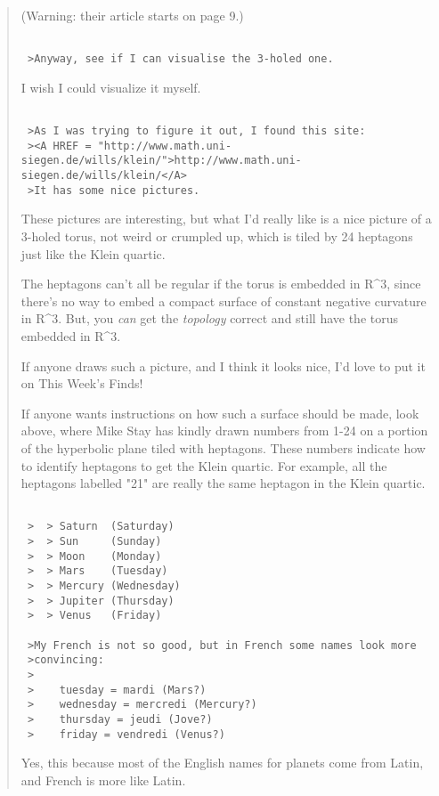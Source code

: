 \begin{quote}
(Warning: their article starts on page 9.)  


\begin{verbatim}

 >Anyway, see if I can visualise the 3-holed one.
\end{verbatim}
    

I wish I could visualize it myself.


\begin{verbatim}

 >As I was trying to figure it out, I found this site:
 ><A HREF = "http://www.math.uni-siegen.de/wills/klein/">http://www.math.uni-siegen.de/wills/klein/</A>
 >It has some nice pictures.
\end{verbatim}
    

These pictures are interesting, but what I'd really like
is a nice picture of a 3-holed torus, not weird or crumpled up, 
which is tiled by 24 heptagons just like the Klein quartic.
 
The heptagons can't all be regular if the torus is embedded in
R^{3}, since there's no way to embed a compact surface of constant
negative curvature in R^{3}.  
But, you \emph{can} get the \emph{topology}
correct and still have the torus embedded in R^{3}.

If anyone draws such a picture, and I think it looks nice, I'd love
to put it on This Week's Finds!

If anyone wants instructions on how such a surface should be made, 
look above, where Mike Stay has kindly drawn numbers from 1-24 on a 
portion of the hyperbolic plane tiled with heptagons.  These numbers 
indicate how to identify heptagons to get the Klein quartic.  For example, 
all the heptagons labelled "21" are really the same 
heptagon in the Klein quartic.


\begin{verbatim}

 >  > Saturn  (Saturday)
 >  > Sun     (Sunday)
 >  > Moon    (Monday)
 >  > Mars    (Tuesday)
 >  > Mercury (Wednesday)
 >  > Jupiter (Thursday)
 >  > Venus   (Friday)

 >My French is not so good, but in French some names look more
 >convincing:
 >
 >    tuesday = mardi (Mars?)
 >    wednesday = mercredi (Mercury?)
 >    thursday = jeudi (Jove?)
 >    friday = vendredi (Venus?)
\end{verbatim}
    

Yes, this because most of the English names for planets come from 
Latin, and French is more like Latin.  


\end{quote}
